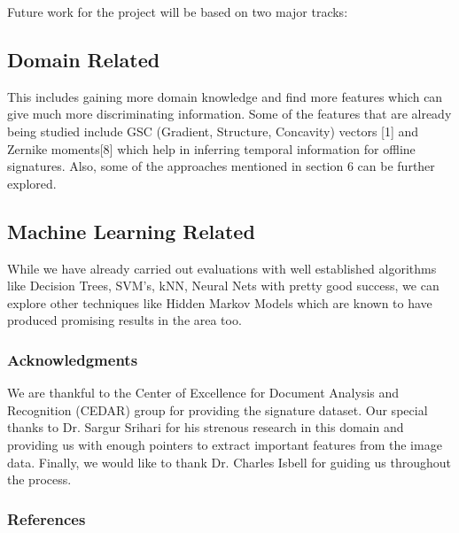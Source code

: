 \documentclass{article}
\begin{document}
Future work for the project will be based on two major tracks:

\subsection{Domain Related}
This includes gaining more domain knowledge and find more features which can give much more discriminating information. Some of the features that are already being studied include GSC (Gradient, Structure, Concavity) vectors [1] and Zernike moments[8] which help in inferring temporal information for offline signatures. Also, some of the approaches mentioned in section 6 can be further explored.

\subsection{Machine Learning Related}
While we have already carried out evaluations with well established algorithms like Decision Trees, SVM's, kNN, Neural Nets with pretty good success, we can  explore other techniques like Hidden Markov Models which are known to have produced promising results in the area too.


\subsubsection*{Acknowledgments}

We are thankful to the Center of Excellence for Document Analysis and Recognition (CEDAR) group for providing the signature dataset. Our special thanks to Dr. Sargur Srihari for his strenous research in this domain and providing us with enough pointers to extract important features from the image data. Finally, we would like to thank Dr. Charles Isbell for guiding us throughout the process.


\subsubsection*{References}
\end{document}
